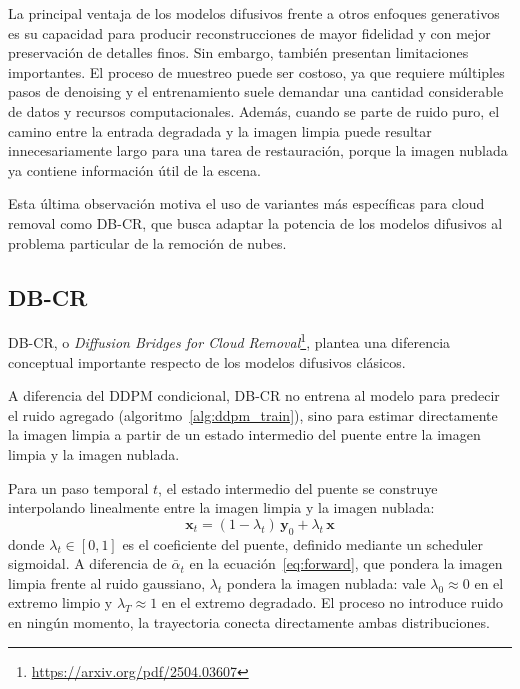 


La principal ventaja de los modelos difusivos frente a otros enfoques generativos es su capacidad para producir reconstrucciones de mayor fidelidad y con mejor preservación de detalles finos. Sin embargo, también presentan limitaciones importantes. El proceso de muestreo puede ser costoso, ya que requiere múltiples pasos de denoising y el entrenamiento suele demandar una cantidad considerable de datos y recursos computacionales. Además, cuando se parte de ruido puro, el camino entre la entrada degradada y la imagen limpia puede resultar innecesariamente largo para una tarea de restauración, porque la imagen nublada ya contiene información útil de la escena.


Esta última observación motiva el uso de variantes más específicas para cloud removal como DB-CR, que busca adaptar la potencia de los modelos difusivos al problema particular de la remoción de nubes.


\subsection{DB-CR}\label{sec:dbcr paper}

DB-CR, o \textit{Diffusion Bridges for Cloud Removal}\footnote{\url{https://arxiv.org/pdf/2504.03607}}, plantea una diferencia conceptual importante respecto de los modelos difusivos clásicos.

A diferencia del DDPM condicional, DB-CR no entrena al modelo para predecir el ruido agregado (algoritmo~\ref{alg:ddpm_train}), sino para estimar directamente la imagen limpia a partir de un estado intermedio del puente entre la imagen limpia y la imagen nublada.


Para un paso temporal $t$, el estado intermedio del puente se construye interpolando linealmente entre la imagen limpia y la imagen nublada:
\begin{equation}
    \mathbf{x}_t = (1-\lambda_t)\,\mathbf{y}_0 + \lambda_t\,\mathbf{x}
    \label{eq:bridge}
\end{equation}
donde $\lambda_t \in [0,1]$ es el coeficiente del puente, definido mediante un scheduler sigmoidal. A diferencia de $\bar\alpha_t$ en la ecuación~\eqref{eq:forward}, que pondera la imagen limpia frente al ruido gaussiano, $\lambda_t$ pondera la imagen nublada: vale $\lambda_0 \approx 0$ en el extremo limpio y $\lambda_T \approx 1$ en el extremo degradado. El proceso no introduce ruido en ningún momento, la trayectoria conecta directamente ambas distribuciones.


